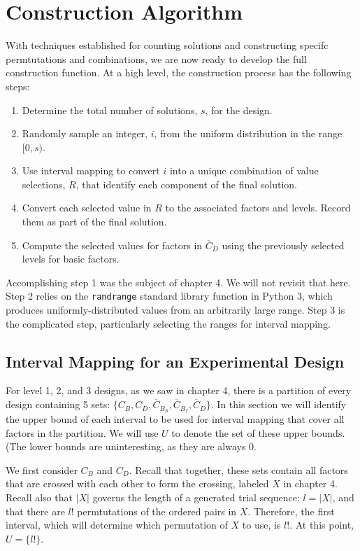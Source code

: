 \section{Construction Algorithm}

With techniques established for counting solutions and constructing specifc permtutations and combinations, we are now ready to develop the full construction function. At a high level, the construction process has the following steps:

\begin{enumerate}
\item Determine the total number of solutions, $s$, for the design.
\item Randomly sample an integer, $i$, from the uniform distribution in the range $[0, s)$.
\item Use interval mapping to convert $i$ into a unique combination of value selections, $R$, that identify each component of the final solution.
\item Convert each selected value in $R$ to the associated factors and levels. Record them as part of the final solution.
\item Compute the selected values for factors in $\overline{C}_D$ using the previously selected levels for basic factors.
\end{enumerate}

Accomplishing step 1 was the subject of chapter 4. We will not revisit that here. Step 2 relies on the \texttt{randrange} standard library function in Python 3, which produces uniformly-distributed values from an arbitrarily large range. Step 3 is the complicated step, particularly selecting the ranges for interval mapping.

\subsection{Interval Mapping for an Experimental Design}

For level 1, 2, and 3 designs, as we saw in chapter 4, there is a partition of every design containing 5 sets: $\{C_B, C_D, \overline{C}_{B_S}, \overline{C}_{B_I}, \overline{C}_D\}$. In this section we will identify the upper bound of each interval to be used for interval mapping that cover all factors in the partition. We will use $U$ to denote the set of these upper bounds. (The lower bounds are uninteresting, as they are always $0$.

We first consider $C_B$ and $C_D$. Recall that together, these sets contain all factors that are crossed with each other to form the crossing, labeled $X$ in chapter 4. Recall also that $|X|$ governs the length of a generated trial sequence: $l = |X|$, and that there are $l!$ permtutations of the ordered pairs in $X$. Therefore, the first interval, which will determine which permutation of $X$ to use, is $l!$. At this point, $U = \{l!\}$.

